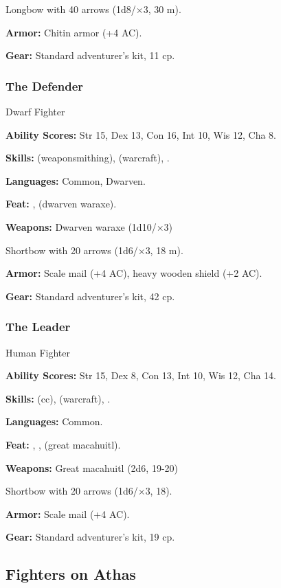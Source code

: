 Longbow with 40 arrows (1d8/$\times$3, 30 m).

\textbf{Armor:} Chitin armor (+4 AC).

\textbf{Gear:} Standard adventurer's kit, 11 cp.

\subsubsection{The Defender}
Dwarf Fighter

\textbf{Ability Scores:} Str 15, Dex 13, Con 16, Int 10, Wis 12, Cha 8.

\textbf{Skills:}  (weaponsmithing),  (warcraft), .

\textbf{Languages:} Common, Dwarven.

\textbf{Feat:} ,  (dwarven waraxe).

\textbf{Weapons:} Dwarven waraxe (1d10/$\times$3)

Shortbow with 20 arrows (1d6/$\times$3, 18 m).

\textbf{Armor:} Scale mail (+4 AC), heavy wooden shield (+2 AC).

\textbf{Gear:} Standard adventurer's kit, 42 cp.

\subsubsection{The Leader}
Human Fighter

\textbf{Ability Scores:} Str 15, Dex 8, Con 13, Int 10, Wis 12, Cha 14.

\textbf{Skills:}  (cc),  (warcraft), .

\textbf{Languages:} Common.

\textbf{Feat:} , ,  (great macahuitl).

\textbf{Weapons:} Great macahuitl (2d6, 19-20)

Shortbow with 20 arrows (1d6/$\times$3, 18).

\textbf{Armor:} Scale mail (+4 AC).

\textbf{Gear:} Standard adventurer's kit, 19 cp.


\subsection{Fighters on Athas}

